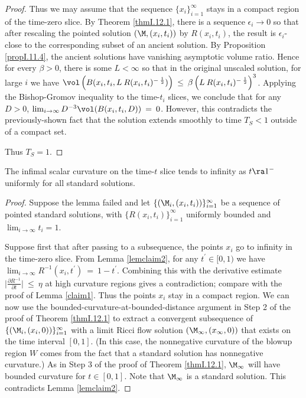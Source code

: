 \begin{proof}
Thus we may assume that
the sequence $\{x_i\}_{i=1}^\infty$ stays in a compact region of the
time-zero slice. By Theorem \ref{thmI.12.1},
there is a sequence $\epsilon_i \rightarrow 0$
so that after rescaling the pointed solution
$(\M, (x_i, t_i))$ by $R(x_i, t_i)$, the result is $\epsilon_i$-close
to the corresponding subset of an ancient solution. By
Proposition \ref{propI.11.4},
the ancient solutions have vanishing asymptotic volume ratio.
Hence for every $\beta > 0$, there is some $L < \infty$ so that
in the original unscaled solution, for large $i$ we have
$\vol \left( B(x_i, t_i, L \: R(x_i, t_i)^{- \: \frac12} ) \right)
\: \le \: \beta \left( L \: R(x_i, t_i)^{- \: \frac12} \right)^3$.
Applying the Bishop-Gromov inequality to the time-$t_i$ slices, we
conclude that for any $D >0$,
$\lim_{i \rightarrow \infty}
D^{-3} \vol(B(x_i, t_i, D)) \: = \: 0$.
However, this contradicts the
previously-shown fact that the solution extends smoothly to time $T_S < 1$
outside of a compact set.

Thus $T_S=1$.
\end{proof}

\begin{lemma}
  \label{lem:kl-blow-up-time-standard-solution-standard-solutions-lemma-3}
 \label{scalarblowup}
The infimal scalar curvature on the time-$t$ slice
tends to infinity as $t\ra 1^-$ uniformly for all standard solutions.
\end{lemma}
\begin{proof}
Suppose the lemma failed and
let $\{(\M_i,(x_i,t_i))\}_{i=1}^\infty$
be a sequence of pointed standard solutions,
with
$\{R(x_i, t_i)\}_{i=1}^\infty$
uniformly bounded and $\lim_{i \rightarrow \infty} t_i = 1$.

Suppose first that after passing to a subsequence,
the points $x_i$ go to infinity in the time-zero
slice. From Lemma \ref{lemclaim2}, for any $t^\prime \in [0,1)$ we have
$\lim_{i \rightarrow \infty} R^{-1}(x_i, t^\prime) \: = \: 1-t^\prime$.
Combining this with the derivative estimate
$\Big| \frac{\partial R^{-1}}{\partial t} \Big| \: \le \: \eta$ at high
curvature regions gives a contradiction; compare with the proof
of Lemma \ref{claim1}.
Thus the points $x_i$ stay in a compact region.
We can now use
the bounded-curvature-at-bounded-distance argument in Step 2 of
the proof of Theorem \ref{thmI.12.1} to extract
a convergent subsequence of $\{(\M_i,(x_i,0))\}_{i=1}^\infty$
with a limit Ricci flow solution
$(\M_\infty,(x_\infty,0))$ that exists on
the time interval $[0,1]$.
(In this case, the nonnegative curvature of the blowup
region $W$ comes from the
fact that a standard solution has nonnegative curvature.)
As in Step 3 of the proof of Theorem
\ref{thmI.12.1}, $\M_\infty$ will have
bounded curvature for $t \in [0,1]$.
Note that $\M_\infty$ is a standard solution.
This contradicts Lemma \ref{lemclaim2}.
\end{proof}

